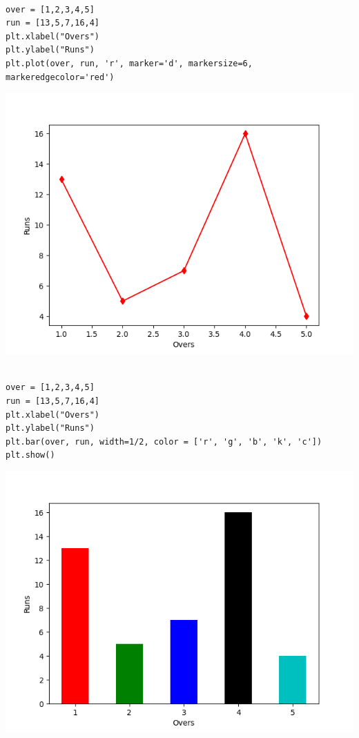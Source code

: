 \documentclass[11pt]{article}
\begin{document}
\begin{verbatim}

over = [1,2,3,4,5]
run = [13,5,7,16,4]
plt.xlabel("Overs")
plt.ylabel("Runs")
plt.plot(over, run, 'r', marker='d', markersize=6, markeredgecolor='red')

\end{verbatim}

\begin{center}
\includegraphics[width=.9\linewidth]{fig2.png}
\end{center}

\begin{verbatim}

over = [1,2,3,4,5]
run = [13,5,7,16,4]
plt.xlabel("Overs")
plt.ylabel("Runs")
plt.bar(over, run, width=1/2, color = ['r', 'g', 'b', 'k', 'c'])
plt.show()

\end{verbatim}

\begin{center}
\includegraphics[width=.9\linewidth]{fig3.png}
\end{center}
\end{document}
